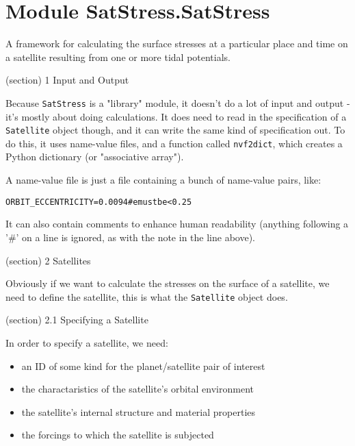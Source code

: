 %
%
%


\section{Module SatStress.SatStress}

    \label{SatStress:SatStress}
A framework for calculating the surface stresses at a particular place and 
time on a satellite resulting from one or more tidal potentials.

(section) 1 Input and Output

  Because \texttt{SatStress} is a "library" module, it doesn't do a lot of 
  input and output - it's mostly about doing calculations.  It does need to
  read in the specification of a \texttt{Satellite} object though, and it 
  can write the same kind of specification out.  To do this, it uses 
  name-value files, and a function called \texttt{nvf2dict}, which creates 
  a Python dictionary (or "associative array").

  A name-value file is just a file containing a bunch of name-value pairs, 
  like:

\begin{alltt}
 ORBIT\_ECCENTRICITY = 0.0094   \# e must be {\textless} 0.25\end{alltt}

  It can also contain comments to enhance human readability (anything 
  following a '\#' on a line is ignored, as with the note in the line 
  above).

(section) 2 Satellites

  Obviously if we want to calculate the stresses on the surface of a 
  satellite, we need to define the satellite, this is what the 
  \texttt{Satellite} object does.

  (section) 2.1 Specifying a Satellite

    In order to specify a satellite, we need:

    \begin{itemize}
    \setlength{\parskip}{0.6ex}
      \item an ID of some kind for the planet/satellite pair of interest

      \item the charactaristics of the satellite's orbital environment

      \item the satellite's internal structure and material properties

      \item the forcings to which the satellite is subjected

    \end{itemize}

